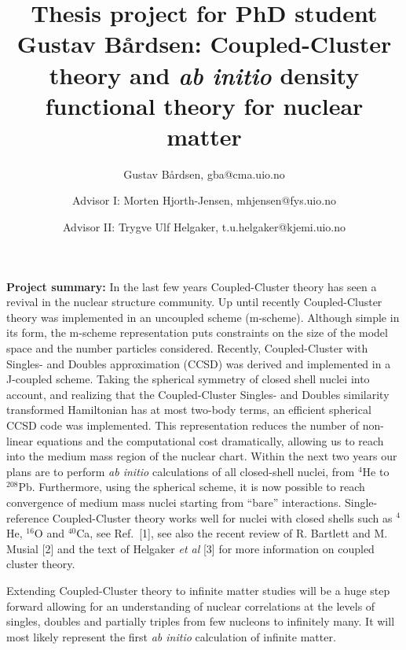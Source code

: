 \documentclass[prl,preprint]{revtex4}
\begin{document}
\title{Thesis project for PhD student Gustav B\aa rdsen: Coupled-Cluster theory and {\em ab initio} density functional theory for nuclear matter}

\author{Gustav B\aa rdsen, gba@cma.uio.no}
\author{Advisor I: Morten Hjorth-Jensen, mhjensen@fys.uio.no}
\author{Advisor II: Trygve Ulf Helgaker, t.u.helgaker@kjemi.uio.no} 


\maketitle


{\bf Project summary:}
In the last few years Coupled-Cluster theory has seen a revival in 
the nuclear structure community. Up until recently Coupled-Cluster 
theory was implemented in an uncoupled scheme (m-scheme). 
Although simple in its form, the m-scheme representation puts
constraints on the size of the model space
and the number particles considered. Recently, Coupled-Cluster with Singles- and Doubles approximation (CCSD)
was derived and implemented in a J-coupled scheme. Taking the spherical 
symmetry of closed shell nuclei into account, and realizing that the
Coupled-Cluster Singles- and Doubles similarity transformed
Hamiltonian has at most two-body terms, an efficient spherical CCSD code was implemented. This 
representation reduces the number of non-linear equations and  the computational cost dramatically, 
allowing us to reach into the medium mass region of the nuclear
chart. Within the next two years our plans are to perform {\em ab initio} calculations of all closed-shell nuclei, from $^4$He to $^{208}$Pb.
Furthermore, using
the spherical scheme, it is now 
possible to reach convergence of medium mass nuclei starting from ``bare'' interactions. 
Single-reference Coupled-Cluster theory works well for nuclei with closed shells such as $^4$He, $^{16}$O
and $^{40}$Ca, see Ref.~[1], see also 
the recent review of R. Bartlett and M. Musial [2] and the text of Helgaker 
{\em et al} [3] for more information on coupled cluster theory.

Extending Coupled-Cluster theory to infinite matter studies will be a huge step forward allowing for an understanding of nuclear correlations at the levels of
singles, doubles and partially triples from few nucleons to infinitely many. It will most likely represent the first {\em ab initio}  calculation of infinite matter. 
\end{document}
